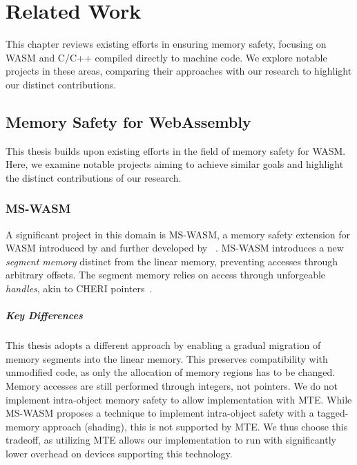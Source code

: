 \chapter{Related Work}
\label{ch:related}

This chapter reviews existing efforts in ensuring memory safety, focusing on \ac{WASM} and C/C++ compiled directly to machine code.
We explore notable projects in these areas, comparing their approaches with our research to highlight our distinct contributions.

\section{Memory Safety for WebAssembly}
\label{sec:related-memory-safety-for-webassembly}

This thesis builds upon existing efforts in the field of memory safety for \ac{WASM}.
Here, we examine notable projects aiming to achieve similar goals and highlight the distinct contributions of our research.

\subsection{MS-WASM}
\label{subsec:ms-wasm}

A significant project in this domain is MS-WASM, a memory safety extension for WASM introduced by \citeauthor*{disselkoen2019position} and further developed by \citeauthor*{michael2023mswasm}~\cite{disselkoen2019position,michael2023mswasm}.
MS-WASM introduces a new \textit{segment memory} distinct from the linear memory, preventing accesses through arbitrary offsets.
The segment memory relies on access through unforgeable \textit{handles}, akin to CHERI pointers~\cite{woodruff2014cheri}.

\paragraph{Key Differences}
This thesis adopts a different approach by enabling a gradual migration of memory segments into the linear memory.
This preserves compatibility with unmodified code, as only the allocation of memory regions has to be changed.
Memory accesses are still performed through integers, not pointers.
We do not implement intra-object memory safety to allow implementation with \ac{MTE}.
While MS-WASM proposes a technique to implement intra-object safety with a tagged-memory approach (shading), this is not supported by \ac{MTE}.
We thus choose this tradeoff, as utilizing \ac{MTE} allows our implementation to run with significantly lower overhead on devices supporting this technology.


